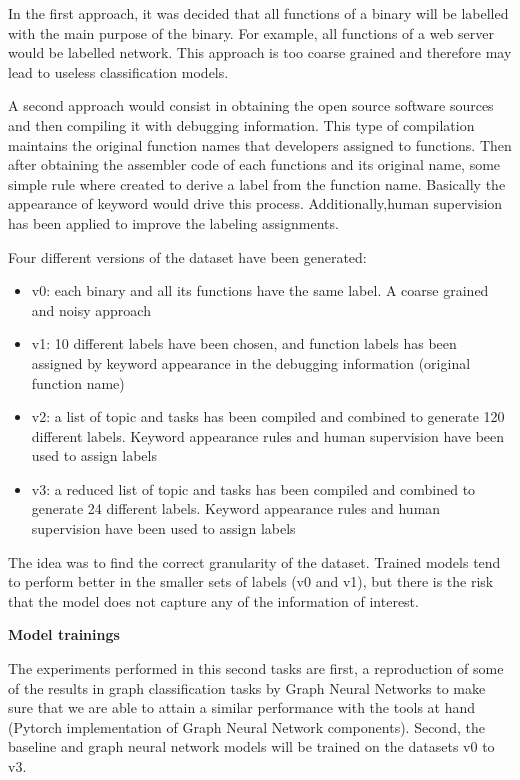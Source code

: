 In the first approach, it was decided that all functions of a binary will be labelled with the main purpose of the binary. For example, all functions of a web server would be labelled network. This approach is too coarse grained and therefore may lead to useless classification models.
 
A second approach would consist in obtaining the open source software sources and then compiling it with debugging information. This type of compilation maintains the original function names that developers assigned to functions. Then after obtaining the assembler code of each functions and its original name, some simple rule where created to derive a label from the function name. Basically the appearance of keyword would drive this process. Additionally,human supervision has been applied to improve the labeling assignments. 

Four different versions of the dataset have been generated:
\begin{itemize}
	\item v0: each binary and all its functions have the same label. A coarse grained and noisy approach
	\item v1: 10 different labels have been chosen, and function labels has been assigned by keyword appearance in the debugging information (original function name)
	\item v2: a list of topic and tasks has been compiled and combined to generate 120 different labels. Keyword appearance rules and human supervision have been used to assign labels
	\item v3: a reduced list of topic and tasks has been compiled and combined to generate 24 different labels. Keyword appearance rules and human supervision have been used to assign labels
\end{itemize}
The idea was to find the correct granularity of the dataset. Trained models tend to perform better in the smaller sets of labels (v0 and v1), but there is the risk that the model does not capture any of the information of interest. 



\textbf{Model trainings}

The experiments performed in this second tasks are first, a reproduction of some of the results in graph classification tasks by Graph Neural Networks to make sure that we are able to attain a similar performance with the tools at hand (Pytorch implementation of Graph Neural Network components). Second, the baseline and graph neural network models will be trained on the datasets v0 to v3. 

